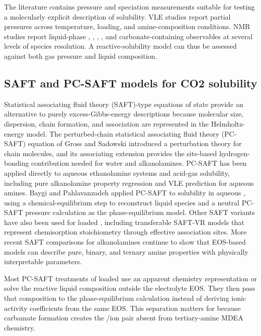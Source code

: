 The \MEA literature contains pressure and speciation measurements suitable for testing a molecularly explicit description of \COtwo solubility.  VLE studies report \COtwo partial pressures across temperature, loading, and amine-composition conditions\cite{Jou1995,Hilliard2008,Mamun2005,Xu2011,Aronu2011}.  NMR studies report liquid-phase \MEA, \MEAH, \MEACOO, \HCOthree, and carbonate-containing observables at several levels of species resolution\cite{Jakobsen2005,Bottinger2008,Matin2012}.  A reactive-solubility model can thus be assessed against both gas pressure and liquid composition.

\subsection{SAFT and PC-SAFT models for CO2 solubility}
Statistical associating fluid theory (SAFT)-type equations of state provide an alternative to purely excess-Gibbs-energy descriptions because molecular size, dispersion, chain formation, and association are represented in the Helmholtz-energy model.  The perturbed-chain statistical associating fluid theory (PC-SAFT) equation of Gross and Sadowski introduced a perturbation theory for chain molecules\cite{Gross2001}, and its associating extension provides the site-based hydrogen-bonding contribution needed for water and alkanolamines\cite{Gross2002}.  PC-SAFT has been applied directly to aqueous ethanolamine systems and acid-gas solubility, including pure alkanolamine property regression and VLE prediction for aqueous amines\cite{Nasrifar2010}.  Baygi and Pahlavanzadeh applied PC-SAFT to \COtwo solubility in aqueous \MEA, using a chemical-equilibrium step to reconstruct liquid species and a neutral PC-SAFT pressure calculation as the phase-equilibrium model\cite{Baygi2015}.  Other SAFT variants have also been used for loaded \MEA, including transferable SAFT-VR models that represent chemisorption stoichiometry through effective association sites\cite{MacDowell2010}.  More recent SAFT comparisons for alkanolamines continue to show that EOS-based models can describe pure, binary, and ternary amine properties with physically interpretable parameters\cite{Pakravesh2025a}.

Most PC-SAFT treatments of loaded \MEA use an apparent chemistry representation or solve the reactive liquid composition outside the electrolyte EOS.  They then pass that composition to the phase-equilibrium calculation instead of deriving ionic activity coefficients from the same EOS.  This separation matters for \MEA because carbamate formation creates the \MEAH/\MEACOO ion pair absent from tertiary-amine MDEA chemistry.

